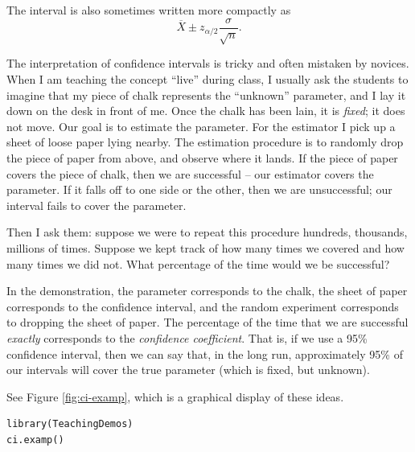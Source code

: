 \documentclass[captions=tableheading]{scrbook}
\begin{document}
\begin{rem}
The interval is also sometimes written more compactly as
\begin{equation}
\overline{X}\pm z_{\alpha/2}\frac{\sigma}{\sqrt{n}}.\label{eq:z-interval}
\end{equation}
\end{rem}

The interpretation of confidence intervals is tricky and often mistaken by novices. When I am teaching the concept ``live'' during class, I usually ask the students to imagine that my piece of chalk represents the ``unknown'' parameter, and I lay it down on the desk in front of me. Once the chalk has been lain, it is \emph{fixed}; it does not move. Our goal is to estimate the parameter. For the estimator I pick up a sheet of loose paper lying nearby. The estimation procedure is to randomly drop the piece of paper from above, and observe where it lands. If the piece of paper covers the piece of chalk, then we are successful -- our estimator covers the parameter. If it falls off to one side or the other, then we are unsuccessful; our interval fails to cover the parameter.

Then I ask them: suppose we were to repeat this procedure hundreds, thousands, millions of times. Suppose we kept track of how many times we covered and how many times we did not. What percentage of the time would we be successful?

In the demonstration, the parameter corresponds to the chalk, the sheet of paper corresponds to the confidence interval, and the random experiment corresponds to dropping the sheet of paper. The percentage of the time that we are successful \emph{exactly} corresponds to the \emph{confidence coefficient}. That is, if we use a 95\% confidence interval, then we can say that, in the long run, approximately 95\% of our intervals will cover the true parameter (which is fixed, but unknown). 

See Figure \ref{fig:ci-examp}, which is a graphical display of these ideas.


\begin{verbatim}
library(TeachingDemos)
ci.examp()
\end{verbatim}
\end{document}
